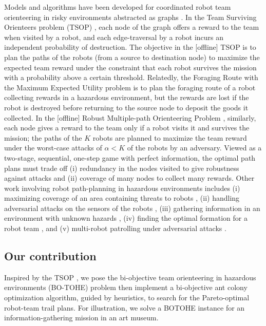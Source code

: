 \documentclass[11pt, oneside]{article}
\begin{document}
Models and algorithms have been developed for coordinated robot team orienteering in risky environments abstracted as graphs \cite{zhou2021multi}. 
In the Team Surviving Orienteers problem (TSOP) \cite{jorgensen2018team,jorgensen2017matroid,jorgensen2024matroid}, each node of the graph offers a reward to the team when visited by a robot, and each edge-traversal by a robot incurs an independent probability of destruction. The objective in the [offline] TSOP is to plan the paths of the robots (from a source to destination node) to maximize the expected team reward under the constraint that each robot survives the mission with a probability above a certain threshold. 
Relatedly, the Foraging Route with the Maximum Expected Utility problem \cite{di2022foraging} is to plan the foraging route of a robot collecting rewards in a hazardous environment, but the rewards are lost if the robot is destroyed before returning to the source node to deposit the goods it collected.
In the [offline] Robust Multiple-path Orienteering Problem \cite{shi2023robust}, similarly, each node gives a reward to the team only if a robot visits it and survives the mission; the paths of the $K$ robots are planned to maximize the team reward under the worst-case attacks of $\alpha<K$ of the robots by an adversary. 
Viewed as a two-stage, sequential, one-step game with perfect information, the optimal path plans must trade off (i) redundancy in the nodes visited to give robustness against attacks and (ii) coverage of many nodes to collect many rewards.
Other work involving robot path-planning in hazardous environments includes 
(i) maximizing coverage of an area containing threats to robots \cite{korngut2023multi,yehoshua2016robotic}, 
(ii) handling adversarial attacks on the sensors of the robots \cite{liu2021distributed,zhou2022distributed,mayya2022adaptive,zhou2018resilient}, 
(iii) gathering information in an environment with unknown hazards \cite{schwager2017multi},
(iv) finding the optimal formation for a robot team \cite{shapira2015path},
and 
(v) multi-robot patrolling under adversarial attacks \cite{huang2019survey}.

\subsection{Our contribution}
Inspired by the TSOP \cite{jorgensen2018team,jorgensen2017matroid,jorgensen2024matroid}, we pose the bi-objective team orienteering in hazardous environments (BO-TOHE) problem then implement a bi-objective ant colony optimization algorithm, guided by heuristics, to search for the Pareto-optimal robot-team trail plans.
For illustration, we solve a BOTOHE instance for an information-gathering mission in an art museum. %
\end{document}
